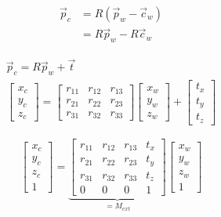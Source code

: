 \begin{subequations} \label{eqn:main}
    \begin{alignat}{2}
        \vec{p}_c & = R(\vec{p}_w-\vec{c}_w) \label{subeqn:a} \\
                  & = R\vec{p}_w -R\vec{c}_w \label{subeqn:b}
    \end{alignat}
\end{subequations}


\begin{gather}
    \vec{p}_c = R\vec{p}_w + \vec{t} \\
    \begin{bmatrix}
        x_c \\ y_c \\ z_c
    \end{bmatrix}
    =
    \begin{bmatrix}
        r_{11} & r_{12} & r_{13} \\
        r_{21} & r_{22} & r_{23} \\
        r_{31} & r_{32} & r_{33}
    \end{bmatrix}
    \begin{bmatrix}
        x_w \\ y_w \\ z_w
    \end{bmatrix}
    +
    \begin{bmatrix}
        t_x \\ t_y \\ t_z
    \end{bmatrix}
\end{gather}


\begin{equation}
    \begin{bmatrix}
        x_c \\ y_c \\ z_c \\ 1
    \end{bmatrix}
    =
    \underbrace{
        \begin{bmatrix}
            r_{11} & r_{12} & r_{13} & t_x \\
            r_{21} & r_{22} & r_{23} & t_y \\
            r_{31} & r_{32} & r_{33} & t_z \\
            0      & 0      & 0      & 1
        \end{bmatrix}
    }_{=M_{ext}}
    \begin{bmatrix}
        x_w \\ y_w \\ z_w \\1
    \end{bmatrix}
\end{equation}

